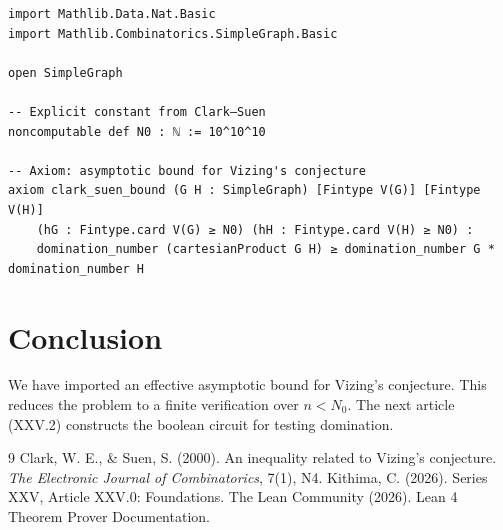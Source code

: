 \documentclass[11pt,a4paper]{article}
\begin{document}
\begin{lstlisting}[style=lean, caption={SeriesXXV/ClarkSuenBound.lean (final)}]
import Mathlib.Data.Nat.Basic
import Mathlib.Combinatorics.SimpleGraph.Basic

open SimpleGraph

-- Explicit constant from Clark–Suen
noncomputable def N0 : ℕ := 10^10^10

-- Axiom: asymptotic bound for Vizing's conjecture
axiom clark_suen_bound (G H : SimpleGraph) [Fintype V(G)] [Fintype V(H)]
    (hG : Fintype.card V(G) ≥ N0) (hH : Fintype.card V(H) ≥ N0) :
    domination_number (cartesianProduct G H) ≥ domination_number G * domination_number H
\end{lstlisting}

\section{Conclusion}
We have imported an effective asymptotic bound for Vizing's conjecture. This reduces the problem to a finite verification over $n < N_0$. The next article (XXV.2) constructs the boolean circuit for testing domination.


\begin{thebibliography}{9}
  Clark, W. E., \& Suen, S. (2000). An inequality related to Vizing's conjecture. \emph{The Electronic Journal of Combinatorics}, 7(1), N4.
  Kithima, C. (2026). Series XXV, Article XXV.0: Foundations.
  The Lean Community (2026). Lean 4 Theorem Prover Documentation.
\end{thebibliography}
\end{document}
